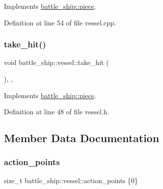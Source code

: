 Implements \hyperlink{classbattle__ship_1_1piece_a052305c855625732d3e5ba96d0fca5f9}{battle\+\_\+ship\+::piece}.



Definition at line 54 of file vessel.\+cpp.

\mbox{\label{classbattle__ship_1_1vessel_ab0da3c305902d55594b7aa5d20b69509}} 
\subsubsection{\texorpdfstring{take\+\_\+hit()}{take\_hit()}}
{\footnotesize\ttfamily void battle\+\_\+ship\+::vessel\+::take\+\_\+hit (\begin{DoxyParamCaption}{ }\end{DoxyParamCaption})\hspace{0.3cm}{\ttfamily [inline]}, {\ttfamily [override]}, {\ttfamily [virtual]}}



Implements \hyperlink{classbattle__ship_1_1piece_a77642906503e12eb22fcfbc3eab98cb5}{battle\+\_\+ship\+::piece}.



Definition at line 48 of file vessel.\+h.



\subsection{Member Data Documentation}
\mbox{\label{classbattle__ship_1_1vessel_a5d2b710e2b58847818ba8e22794a97a4}} 
\subsubsection{\texorpdfstring{action\+\_\+points}{action\_points}}
{\footnotesize\ttfamily size\+\_\+t battle\+\_\+ship\+::vessel\+::action\+\_\+points \{0\}\hspace{0.3cm}{\ttfamily [protected]}}



